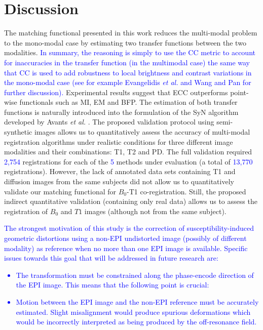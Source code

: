 \section{Discussion}
The matching functional presented in this work reduces the multi-modal problem to the mono-modal case by estimating two transfer functions between the two modalities. \textcolor{blue}{In summary, the reasoning is simply to use the CC metric to account for inaccuracies in the transfer function (in the multimodal case) the same way that CC is used to add robustness to local brightness and contrast variations in the mono-modal case (see for example Evangelidis {\it et al.} \cite{Evangelidis2008} and Wang and Pan \cite{Wang2014} for further discussion).} Experimental results suggest that ECC outperforms point-wise functionals such as MI, EM and BFP. The estimation of both transfer functions is naturally introduced into the formulation of the SyN algorithm developed by Avants {\it et al.} \cite{Avants2008, Avants2011}. The proposed validation protocol using semi-synthetic images \cite{Ocegueda2015} allows us to quantitatively assess the accuracy of multi-modal registration algorithms under realistic conditions for three different image modalities and their combinations: T1, T2 and PD. The full validation required \textcolor{blue}{2,754} registrations for each of the \textcolor{blue}{5} methods under evaluation (a total of \textcolor{blue}{13,770} registrations). However, the lack of annotated data sets containing T1 and diffusion images from the same subjects did not allow us to quantitatively validate our matching functional for $B_{0}$-T1 co-registration. Still, the proposed indirect quantitative validation (containing only real data) allows us to assess the registration of $B_{0}$ and $T1$ images (although not from the same subject). \textcolor{blue}{The strongest motivation of this study is  the correction of susceptibility-induced geometric distortions using a non-EPI undistorted image (possibly of different modality) as reference when no more than one EPI image is available. Specific issues towards this goal that will be addressed in future research are:
\begin{itemize}
    \item{The transformation must be constrained along the phase-encode direction of the EPI image. This means that the following point is crucial:}
    \item{Motion between the EPI image and the non-EPI reference must be accurately estimated. Slight misalignment would produce spurious deformations which would be incorrectly interpreted as being produced by the off-resonance field.}

\end{itemize}}
